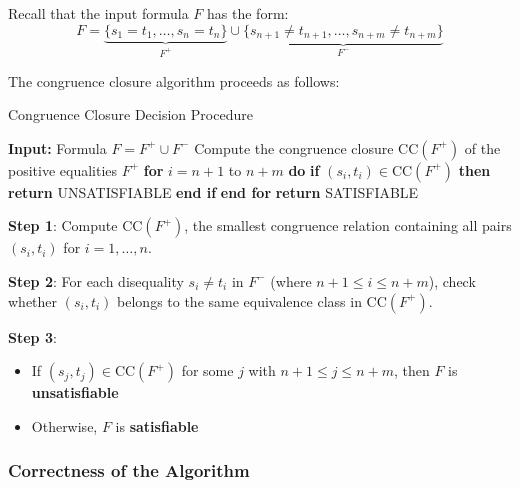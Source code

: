\documentclass[11pt,a4paper]{article}
\theoremstyle{definition}
\theoremstyle{plain}
\theoremstyle{remark}
\begin{document}
Recall that the input formula $F$ has the form:
\[
F = \underbrace{\{s_1 = t_1, \dots, s_n = t_n\}}_{F^+} \cup \underbrace{\{s_{n+1} \neq t_{n+1}, \dots, s_{n+m} \neq t_{n+m}\}}_{F^-}
\]

The congruence closure algorithm proceeds as follows:

\begin{algorithm}[H]
\caption{Congruence Closure Decision Procedure}
\begin{algorithmic}[1]
\STATE \textbf{Input:} Formula $F = F^+ \cup F^-$
\STATE Compute the congruence closure $\text{CC}(F^+)$ of the positive equalities $F^+$
\STATE \textbf{for} $i = n+1$ to $n+m$ \textbf{do}
\STATE \quad \textbf{if} $(s_i, t_i) \in \text{CC}(F^+)$ \textbf{then}
\STATE \quad \quad \textbf{return} UNSATISFIABLE
\STATE \quad \textbf{end if}
\STATE \textbf{end for}
\STATE \textbf{return} SATISFIABLE
\end{algorithmic}
\end{algorithm}

\textbf{Step 1}: Compute $\text{CC}(F^+)$, the smallest congruence relation containing all pairs $(s_i, t_i)$ for $i = 1, \dots, n$.

\textbf{Step 2}: For each disequality $s_i \neq t_i$ in $F^-$ (where $n+1 \leq i \leq n+m$), check whether $(s_i, t_i)$ belongs to the same equivalence class in $\text{CC}(F^+)$.

\textbf{Step 3}: 
\begin{itemize}
    \item If $(s_j, t_j) \in \text{CC}(F^+)$ for some $j$ with $n+1 \leq j \leq n+m$, then $F$ is \textbf{unsatisfiable}
    \item Otherwise, $F$ is \textbf{satisfiable}
\end{itemize}

\begin{center}
\end{center}

\subsubsection{Correctness of the Algorithm}
\end{document}

